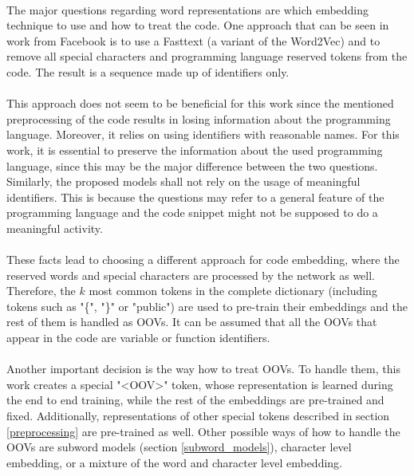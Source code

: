 \paragraph{}
The major questions regarding word representations are which embedding technique to use and how to treat the code. One approach that can be seen in work from Facebook \cite{facebook0_unsupervised} is to use a Fasttext (a variant of the Word2Vec) and to remove all special characters and programming language reserved tokens from the code. The result is a sequence made up of identifiers only.

\paragraph{}
This approach does not seem to be beneficial for this work since the mentioned preprocessing of the code results in losing information about the programming language. Moreover, it relies on using identifiers with reasonable names. For this work, it is essential  to preserve the information about the used programming language, since this may be the major difference between the two questions. Similarly, the proposed models shall not rely on the usage of meaningful identifiers. This is because the questions may refer to a general feature of the programming language and the code snippet might not be supposed to do a meaningful activity.

\paragraph{}
These facts lead to choosing a different approach for code embedding, where the reserved words and special characters are processed by the network as well. Therefore, the $k$ most common tokens in the complete dictionary (including tokens such as "\{", "\}" or "public") are used to pre-train their embeddings and the rest of them is handled as OOVs. It can be assumed that all the OOVs that appear in the code are variable or function identifiers.

\paragraph{}
Another important decision is the way how to treat OOVs. To handle them, this work creates a special "<OOV>" token, whose representation is learned during the end to end training, while the rest of the embeddings are pre-trained and fixed. Additionally, representations of other special tokens described in section \ref{preprocessing} are pre-trained as well. Other possible ways of how to handle the OOVs are subword models (section \ref{subword_models}), character level embedding, or a mixture of the word and character level embedding.

